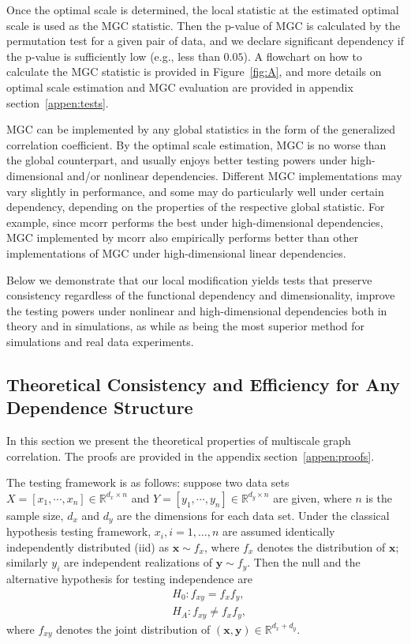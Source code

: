 \documentclass[11pt]{article}
\providecommand{\mb}[1]{\boldsymbol{#1}}
\newcommand{\Real}{\mathbb{R}}
\begin{document}
Once the optimal scale is determined, the local statistic at the estimated optimal scale is used as the MGC statistic. Then the p-value of MGC is calculated by the permutation test for a given pair of data, and we declare significant dependency if the p-value is sufficiently low (e.g., less than $0.05$). A flowchart on how to calculate the MGC statistic is provided in Figure~\ref{fig:A}, and more details on optimal scale estimation and MGC evaluation are provided in appendix section~\ref{appen:tests}.

MGC can be implemented by any global statistics in the form of the generalized correlation coefficient. By the optimal scale estimation, MGC is no worse than the global counterpart, and usually enjoys better testing powers under high-dimensional and/or nonlinear dependencies. Different MGC implementations may vary slightly in performance, and some may do particularly well under certain dependency, depending on the properties of the respective global statistic. For example, since mcorr performs the best under high-dimensional dependencies, MGC implemented by mcorr also empirically performs better than other implementations of MGC under high-dimensional linear dependencies. 

Below we demonstrate that our local modification yields tests that preserve consistency regardless of the functional dependency and dimensionality, improve the testing powers under nonlinear and high-dimensional dependencies both in theory and in simulations, as while as being the most superior method for simulations and real data experiments.


\subsection{Theoretical Consistency and Efficiency for Any Dependence Structure}
\label{main2}
In this section we present the theoretical properties of multiscale graph correlation. The proofs are provided in the appendix section~\ref{appen:proofs}. 

The testing framework is as follows: suppose two data sets $X=[x_{1},\cdots, x_{n}] \in \Real^{d_{x} \times n}$ and $Y=[y_{1},\cdots, y_{n}] \in \Real^{d_{y} \times n}$ are given, where $n$ is the sample size, $d_{x}$ and $d_{y}$ are the dimensions for each data set. Under the classical hypothesis testing framework, $x_{i}, i=1,\ldots,n$ are assumed identically independently distributed (iid) as $\mb{x} \sim f_{x}$, where $f_{x}$ denotes the distribution of $\mb{x}$; similarly $y_{i}$ are independent realizations of $\mb{y} \sim f_{y}$. Then the null and the alternative hypothesis for testing independence are
\begin{align*}
& H_{0}: f_{xy}=f_{x}f_{y},\\
& H_{A}: f_{xy} \neq f_{x}f_{y},
\end{align*}
where $f_{xy}$ denotes the joint distribution of $(\mb{x},\mb{y}) \in \Real^{d_{x} + d_{y}}$. 
\end{document}
